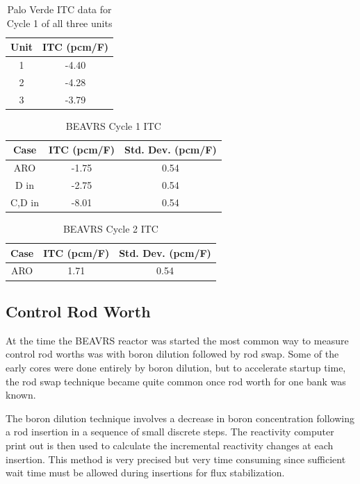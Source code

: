 \documentclass{article}
\begin{document}
\begin{table}[ht]
\centering
\caption{Palo Verde ITC data for Cycle 1 of all three units}
\begin{tabular}{ |c|c| } 
 \hline
 Unit & ITC (pcm/F) \\  
 \hline
 1 & -4.40 \\ 
 2 & -4.28 \\
 3 & -3.79 \\
 \hline
 \end{tabular}
\label{tab:palov_itc_cyc1}
\end{table}


\begin{table}[ht]
\centering
\caption{BEAVRS Cycle 1 ITC}
\begin{tabular}{ |c|c|c| } 
 \hline
 Case & ITC (pcm/F) & Std. Dev. (pcm/F) \\  
 \hline
 ARO & -1.75 & 0.54 \\ 
 D in & -2.75 & 0.54  \\
 C,D in & -8.01 & 0.54  \\
 \hline
 \end{tabular}
\label{tab:beavrs_itc_cyc1}
\end{table}

\begin{table}[ht]
\centering
\caption{BEAVRS Cycle 2 ITC}
\begin{tabular}{ |c|c|c| } 
 \hline
 Case & ITC (pcm/F) & Std. Dev. (pcm/F) \\  
 \hline
 ARO & 1.71 & 0.54 \\ 
 \hline
 \end{tabular}
\label{tab:beavrs_itc_cyc2}
\end{table}


\subsection{Control Rod Worth}

At the time the BEAVRS reactor was started the most common way to measure control rod worths was with boron dilution followed by rod swap.  Some of the early cores were done entirely by boron dilution, but to accelerate startup time, the rod swap technique became quite common once rod worth for one bank was known.  

The boron dilution technique involves a decrease in boron concentration following a rod insertion in a sequence of small discrete steps.  The reactivity computer print out is then used to calculate the incremental reactivity changes at each insertion.  This method is very precised but very time consuming since sufficient wait time must be allowed during insertions for flux stabilization.
\end{document}
